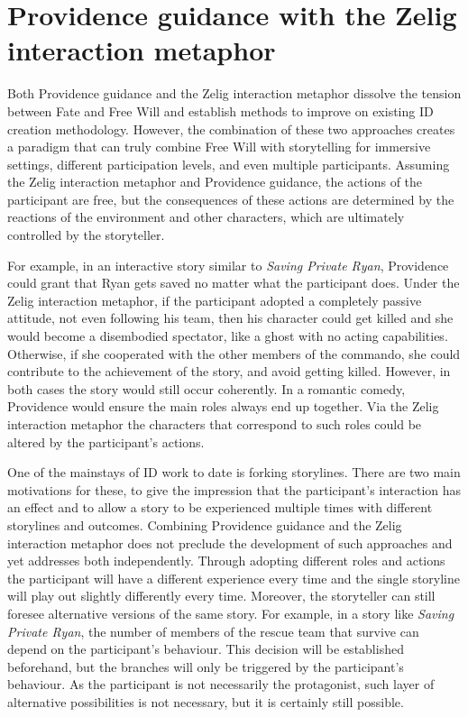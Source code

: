 \documentclass[
		twoside,openright,titlepage,numbers=noenddot,manychapters,
		headinclude,%
                footinclude=false,cleardoublepage=empty,
                BCOR=5mm,
		fontsize=11pt, %
                 enabledeprecatedfontcommands]{scrreprt}
\begin{document}
\section[Providence with the Zelig interaction metaphor]{Providence guidance with the Zelig interaction metaphor}
Both Providence guidance and the Zelig interaction metaphor dissolve the tension between Fate and Free Will and establish methods to improve on existing ID creation methodology. However, the combination of these two approaches creates a paradigm that can truly combine Free Will with storytelling for immersive settings, different participation levels, and even multiple participants. Assuming the Zelig interaction metaphor and Providence guidance, the actions of the participant are free, but the consequences of these actions are determined by the reactions of the environment and other characters, which are ultimately controlled by the storyteller. 

For example, in an interactive story similar to \emph{Saving Private Ryan}, Providence could grant that Ryan gets saved no matter what the participant does. Under the Zelig interaction metaphor, if the participant adopted a completely passive attitude, not even following his team, then his character could get killed and she would become a disembodied spectator, like a ghost with no acting capabilities. Otherwise, if she cooperated with the other members of the commando, she could contribute to the achievement of the story, and avoid getting killed. However, in both cases the story would still occur coherently. In a romantic comedy, Providence would ensure the main roles always end up together. Via the Zelig interaction metaphor the characters that correspond to such roles could be altered by the participant’s actions.

One of the mainstays of ID work to date is forking storylines. There are two main motivations for these, to give the impression that the participant’s interaction has an effect and to allow a story to be experienced multiple times with different storylines and outcomes. Combining Providence guidance and the Zelig interaction metaphor does not preclude the development of such approaches and yet addresses both independently. Through adopting different roles and actions the participant will have a different experience every time and the single storyline will play out slightly differently every time. Moreover, the storyteller can still foresee alternative versions of the same story. For example, in a story like \emph{Saving Private Ryan}, the number of members of the rescue team that survive can depend on the participant’s behaviour. This decision will be established beforehand, but the branches will only be triggered by the participant’s behaviour. As the participant is not necessarily the protagonist, such layer of alternative possibilities is not necessary, but it is certainly still possible. 
\end{document}
